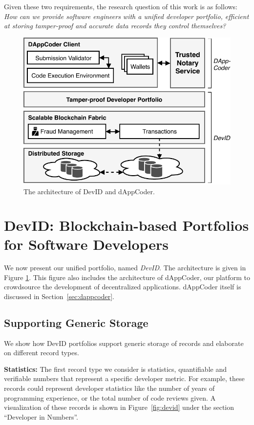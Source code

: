 Given these two requirements, the research question of this work is as follows:
\textit{How can we provide software engineers with a unified developer portfolio, efficient at storing tamper-proof and accurate data records they control themselves?}
\begin{figure}[t!]
	\includegraphics[width=.8\linewidth]{devid/resources/architecture.pdf}
	\caption{The architecture of DevID and dAppCoder.}
	\label{fig:system_architecture}
\end{figure}

\section{DevID: Blockchain-based Portfolios for Software Developers}
\label{sec:devid_architecture}
We now present our unified portfolio, named \emph{DevID}.
The architecture is given in Figure \ref{fig:system_architecture}.
This figure also includes the architecture of dAppCoder, our platform to crowdsource the development of decentralized applications.
dAppCoder itself is discussed in Section~\ref{sec:dappcoder}.

\subsection{Supporting Generic Storage}
We show how DevID portfolios support generic storage of records and elaborate on different record types.

\textbf{Statistics:}
The first record type we consider is statistics, quantifiable and verifiable numbers that represent a specific developer metric.
For example, these records could represent developer statistics like the number of years of programming experience, or the total number of code reviews given.
A visualization of these records is shown in Figure~\ref{fig:devid} under the section \enquote{Developer in Numbers}.

